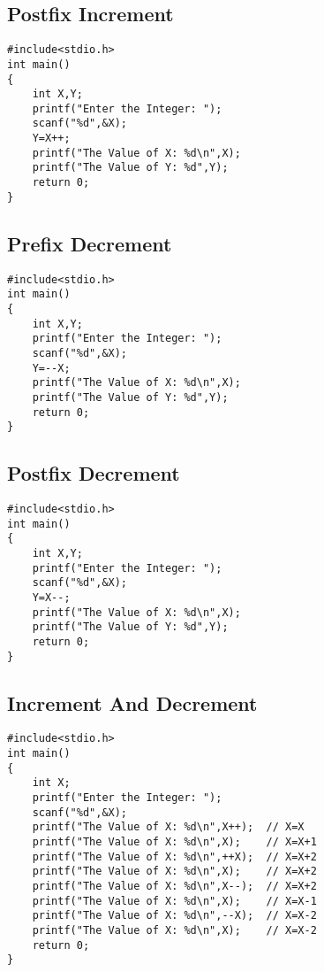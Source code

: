 \documentclass[a4paper,14pt]{article}
\begin{document}
\subsection{Postfix Increment}
\vspace{0.5cm}
\begin{lstlisting}[caption={Postfix Increment}]
#include<stdio.h>
int main()
{
    int X,Y;
    printf("Enter the Integer: ");
    scanf("%d",&X);
    Y=X++;
    printf("The Value of X: %d\n",X);
    printf("The Value of Y: %d",Y);
    return 0;
}
\end{lstlisting}
\newpage

\subsection{Prefix Decrement}
\vspace{0.5cm}
\begin{lstlisting}[caption={Prefix Decrement}]
#include<stdio.h>
int main()
{
    int X,Y;
    printf("Enter the Integer: ");
    scanf("%d",&X);
    Y=--X;
    printf("The Value of X: %d\n",X);
    printf("The Value of Y: %d",Y);
    return 0;
}
\end{lstlisting}
\newpage

\subsection{Postfix Decrement}
\vspace{0.5cm}
\begin{lstlisting}[caption={Postfix Decrement}]
#include<stdio.h>
int main()
{
    int X,Y;
    printf("Enter the Integer: ");
    scanf("%d",&X);
    Y=X--;
    printf("The Value of X: %d\n",X);
    printf("The Value of Y: %d",Y);
    return 0;
}
\end{lstlisting}
\newpage

\subsection{Increment And Decrement}
\vspace{0.5cm}
\begin{lstlisting}[caption={Increment And Decrement}]
#include<stdio.h>
int main()
{
    int X;
    printf("Enter the Integer: ");
    scanf("%d",&X);
    printf("The Value of X: %d\n",X++);  // X=X
    printf("The Value of X: %d\n",X);    // X=X+1
    printf("The Value of X: %d\n",++X);  // X=X+2
    printf("The Value of X: %d\n",X);    // X=X+2
    printf("The Value of X: %d\n",X--);  // X=X+2
    printf("The Value of X: %d\n",X);    // X=X-1
    printf("The Value of X: %d\n",--X);  // X=X-2
    printf("The Value of X: %d\n",X);    // X=X-2
    return 0;
}
\end{lstlisting}
\newpage
\end{document}

